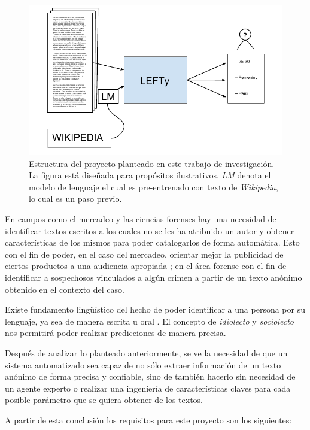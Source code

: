 \begin{figure}
\includegraphics[scale=1.0]{Figures/projectstruct.pdf}
\caption{Estructura del proyecto planteado en este trabajo de investigación. La figura está diseñada para propósitos ilustrativos. \textit{LM} denota el modelo de lenguaje el cual es pre-entrenado con texto de \textit{Wikipedia}, lo cual es un paso previo.}
\label{fig:projstruct}
\end{figure}

En campos como el mercadeo y las ciencias forenses hay una necesidad de identificar textos escritos a los cuales no se les ha atribuido un autor y obtener características de los mismos para poder catalogarlos de forma automática. Esto con el fin de poder, en el caso del mercadeo, orientar mejor la publicidad de ciertos productos a una audiencia apropiada \parencite{aggarwal2012mining}; en el área forense con el fin de identificar a sospechosos vinculados a algún crimen a partir de un texto anónimo obtenido en el contexto del caso.

Existe fundamento lingüístico del hecho de poder identificar a una persona por su lenguaje, ya sea de manera escrita u oral \parencite{coulthard2004author, louwerse2004semantic}. El concepto de \textit{\gls{idiolecto}} y \textit{\gls{sociolecto}} nos permitirá poder realizar predicciones de manera precisa.

Después de analizar lo planteado anteriormente, se ve la necesidad de que un sistema automatizado sea capaz de no sólo extraer información de un texto anónimo de forma precisa y confiable, sino de también hacerlo sin necesidad de un agente experto o realizar una ingeniería de características claves para cada posible parámetro que se quiera obtener de los textos.

A partir de esta conclusión los requisitos para este proyecto son los siguientes:

